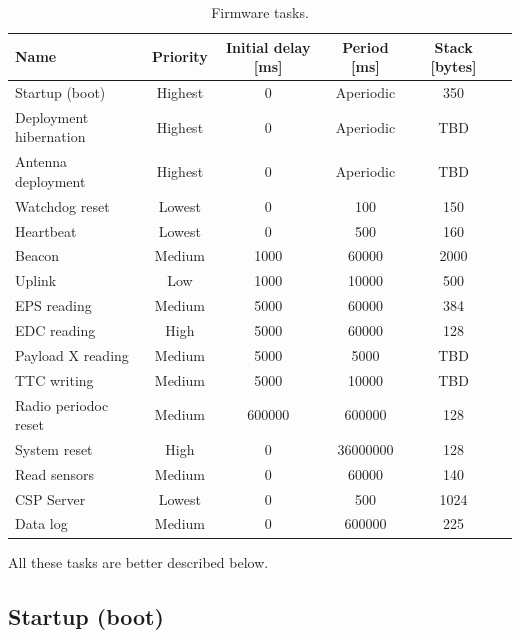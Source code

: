 \begin{table}[!h]
    \centering
    \begin{tabular}{lccccc}
        \toprule[1.5pt]
        \textbf{Name}          & \textbf{Priority} & \textbf{Initial delay [ms]} & \textbf{Period [ms]} & \textbf{Stack [bytes]} \\
        \midrule
        Startup (boot)         & Highest & 0      & Aperiodic & 350  \\
        Deployment hibernation & Highest & 0      & Aperiodic & TBD  \\
        Antenna deployment     & Highest & 0      & Aperiodic & TBD  \\
        Watchdog reset         & Lowest  & 0      & 100       & 150  \\
        Heartbeat              & Lowest  & 0      & 500       & 160  \\
        Beacon                 & Medium  & 1000   & 60000     & 2000 \\
        Uplink                 & Low     & 1000   & 10000     & 500  \\
        EPS reading            & Medium  & 5000   & 60000     & 384  \\
        EDC reading            & High    & 5000   & 60000     & 128  \\
        Payload X reading      & Medium  & 5000   & 5000      & TBD  \\
        TTC writing            & Medium  & 5000   & 10000     & TBD  \\
        Radio periodoc reset   & Medium  & 600000 & 600000    & 128  \\
        System reset           & High    & 0      & 36000000  & 128  \\
        Read sensors           & Medium  & 0      & 60000     & 140  \\
        CSP Server             & Lowest  & 0      & 500       & 1024 \\
        Data log               & Medium  & 0      & 600000    & 225  \\
        \bottomrule[1.5pt]
    \end{tabular}
    \caption{Firmware tasks.}
    \label{tab:firmware-tasks}
\end{table}

All these tasks are better described below.

\subsection{Startup (boot)}


